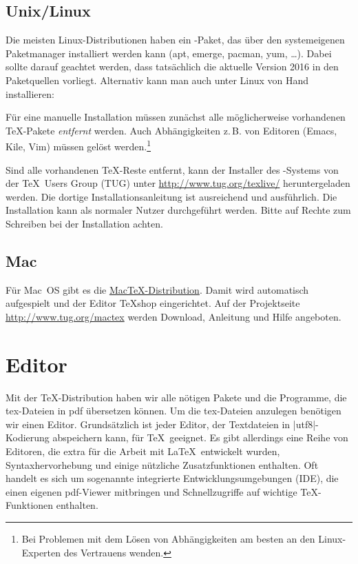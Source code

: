 \documentclass[
	vorläufig=false, 
	datum=2021-10-20,
	titel=Installationshinweise,
]{../tex/latexkurs-exercise}
\begin{document}
\subsection*{Unix/Linux}

Die meisten Linux-Distributionen haben ein \TeXlive-Paket, das über den systemeigenen Paketmanager installiert werden kann (apt, emerge, pacman, yum, …).
Dabei sollte darauf geachtet werden, dass tatsächlich die aktuelle Version 2016 in den Paketquellen vorliegt. Alternativ kann man \TeXlive auch unter Linux von Hand installieren:


Für eine manuelle Installation müssen zunächst alle möglicherweise vorhandenen \TeX-Pakete \emph{entfernt} werden. Auch Abhängigkeiten z.\,B. von Editoren (Emacs, Kile, Vim) müssen gelöst werden.\footnote{Bei Problemen mit dem Lösen von Abhängigkeiten am besten an den Linux-Experten des Vertrauens wenden.}

Sind alle vorhandenen \TeX-Reste entfernt, kann der Installer des \TeXlive-Systems von der \TeX\ Users Group (TUG) unter \url{http://www.tug.org/texlive/} heruntergeladen werden. Die dortige Installationsanleitung ist ausreichend und ausführlich. Die Installation kann als normaler Nutzer durchgeführt werden. Bitte auf Rechte zum Schreiben bei der Installation achten.

\enlargethispage{\baselineskip}

\subsection*{Mac}
Für Mac~OS gibt es die \href{http://www.tug.org/mactex}{Mac\TeX-Distribution}. Damit wird automatisch  \TeXlive aufgespielt und  der Editor \TeX shop eingerichtet. Auf der Projektseite \url{http://www.tug.org/mactex} werden Download, Anleitung und Hilfe angeboten.


\newpage

\section{Editor}

Mit der \TeX-Distribution haben wir alle nötigen Pakete und die Programme, die tex-Dateien in pdf übersetzen können. Um die tex-Dateien anzulegen benötigen wir einen Editor. Grundsätzlich ist jeder Editor, der Textdateien in |utf8|-Kodierung abspeichern kann, für \TeX\ geeignet. Es gibt allerdings eine Reihe von Editoren, die extra für die Arbeit mit \LaTeX\ entwickelt wurden, Syntaxhervorhebung und einige nützliche Zusatzfunktionen enthalten. Oft handelt es sich um sogenannte integrierte Entwicklungsumgebungen (IDE), die einen eigenen pdf-Viewer mitbringen und Schnellzugriffe auf wichtige \TeX-Funktionen enthalten.
\end{document}
